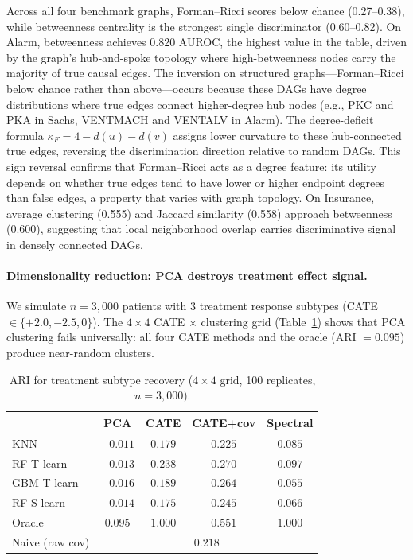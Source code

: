 \documentclass{article}
\begin{document}
Across all four benchmark graphs, Forman--Ricci scores below chance (0.27--0.38), while betweenness centrality is the strongest single discriminator (0.60--0.82). On Alarm, betweenness achieves 0.820 AUROC, the highest value in the table, driven by the graph's hub-and-spoke topology where high-betweenness nodes carry the majority of true causal edges. The inversion on structured graphs---Forman--Ricci below chance rather than above---occurs because these DAGs have degree distributions where true edges connect higher-degree hub nodes (e.g., PKC and PKA in Sachs, VENTMACH and VENTALV in Alarm). The degree-deficit formula $\kappa_F = 4 - d(u) - d(v)$ assigns lower curvature to these hub-connected true edges, reversing the discrimination direction relative to random DAGs. This sign reversal confirms that Forman--Ricci acts as a degree feature: its utility depends on whether true edges tend to have lower or higher endpoint degrees than false edges, a property that varies with graph topology. On Insurance, average clustering (0.555) and Jaccard similarity (0.558) approach betweenness (0.600), suggesting that local neighborhood overlap carries discriminative signal in densely connected DAGs.

\paragraph{Dimensionality reduction: PCA destroys treatment effect signal.}
We simulate $n = 3{,}000$ patients with 3 treatment response subtypes (CATE $\in \{+2.0, -2.5, 0\}$).
The $4 \times 4$ CATE $\times$ clustering grid (Table~\ref{tab:hte}) shows that PCA clustering fails universally: all four CATE methods and the oracle (ARI $= 0.095$) produce near-random clusters.

\begin{table}[t]
\centering
\caption{ARI for treatment subtype recovery ($4 \times 4$ grid, 100 replicates, $n = 3{,}000$).}
\label{tab:hte}
\small
\begin{tabular}{@{}lcccc@{}}
\toprule
 & \textbf{PCA} & \textbf{CATE} & \textbf{CATE+cov} & \textbf{Spectral} \\
\midrule
KNN       & $-0.011$ & $0.179$ & $0.225$ & $0.085$ \\
RF T-learn  & $-0.013$ & $0.238$ & $\mathbf{0.270}$ & $0.097$ \\
GBM T-learn & $-0.016$ & $0.189$ & $0.264$ & $0.055$ \\
RF S-learn  & $-0.014$ & $0.175$ & $0.245$ & $0.066$ \\
\midrule
Oracle        & $0.095$  & $1.000$ & $0.551$ & $1.000$ \\
Naive (raw cov) & \multicolumn{4}{c}{$0.218$} \\
\bottomrule
\end{tabular}
\end{table}
\end{document}
